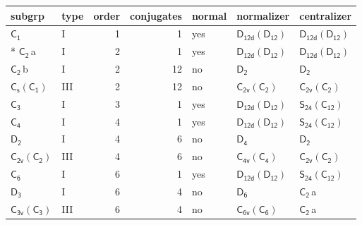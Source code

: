 \documentclass[10pt,a4paper]{article}
\numberwithin{equation}{section}
\newcommand{\grp}[1]{\mathsf{#1}}
\newcommand{\clsletter}[1]{\,{\scriptsize\color{black!55}#1}}
\begin{document}
{\small\begin{longtable}{@{}llrrlll@{}}\toprule
subgrp & type & order & conjugates & normal & normalizer & centralizer\\\midrule\endhead
\bottomrule\endfoot\endlastfoot
\href{../../../rotation/data/pdf/C1.pdf}{$\grp{C_{1}}$} & I & 1 & 1 & yes & \href{D12d-D12.pdf}{$\grp{D_{12d}}(\grp{D_{12}})$} & \href{D12d-D12.pdf}{$\grp{D_{12d}}(\grp{D_{12}})$}\\*
\href{../../../rotation/data/pdf/C2.pdf}{$\grp{C_{2}}$}\clsletter{a} & I & 2 & 1 & yes & \href{D12d-D12.pdf}{$\grp{D_{12d}}(\grp{D_{12}})$} & \href{D12d-D12.pdf}{$\grp{D_{12d}}(\grp{D_{12}})$}\\
\href{../../../rotation/data/pdf/C2.pdf}{$\grp{C_{2}}$}\clsletter{b} & I & 2 & 12 & no & \href{../../../rotation/data/pdf/D2.pdf}{$\grp{D_{2}}$} & \href{../../../rotation/data/pdf/D2.pdf}{$\grp{D_{2}}$}\\
\href{C1v-C1.pdf}{$\grp{C_{s}}(\grp{C_{1}})$} & III & 2 & 12 & no & \href{C2v-C2.pdf}{$\grp{C_{2v}}(\grp{C_{2}})$} & \href{C2v-C2.pdf}{$\grp{C_{2v}}(\grp{C_{2}})$}\\
\href{../../../rotation/data/pdf/C3.pdf}{$\grp{C_{3}}$} & I & 3 & 1 & yes & \href{D12d-D12.pdf}{$\grp{D_{12d}}(\grp{D_{12}})$} & \href{S24-C12.pdf}{$\grp{S_{24}}(\grp{C_{12}})$}\\
\href{../../../rotation/data/pdf/C4.pdf}{$\grp{C_{4}}$} & I & 4 & 1 & yes & \href{D12d-D12.pdf}{$\grp{D_{12d}}(\grp{D_{12}})$} & \href{S24-C12.pdf}{$\grp{S_{24}}(\grp{C_{12}})$}\\
\href{../../../rotation/data/pdf/D2.pdf}{$\grp{D_{2}}$} & I & 4 & 6 & no & \href{../../../rotation/data/pdf/D4.pdf}{$\grp{D_{4}}$} & \href{../../../rotation/data/pdf/D2.pdf}{$\grp{D_{2}}$}\\
\href{C2v-C2.pdf}{$\grp{C_{2v}}(\grp{C_{2}})$} & III & 4 & 6 & no & \href{C4v-C4.pdf}{$\grp{C_{4v}}(\grp{C_{4}})$} & \href{C2v-C2.pdf}{$\grp{C_{2v}}(\grp{C_{2}})$}\\
\href{../../../rotation/data/pdf/C6.pdf}{$\grp{C_{6}}$} & I & 6 & 1 & yes & \href{D12d-D12.pdf}{$\grp{D_{12d}}(\grp{D_{12}})$} & \href{S24-C12.pdf}{$\grp{S_{24}}(\grp{C_{12}})$}\\
\href{../../../rotation/data/pdf/D3.pdf}{$\grp{D_{3}}$} & I & 6 & 4 & no & \href{../../../rotation/data/pdf/D6.pdf}{$\grp{D_{6}}$} & \href{../../../rotation/data/pdf/C2.pdf}{$\grp{C_{2}}$}\clsletter{a}\\
\href{C3v-C3.pdf}{$\grp{C_{3v}}(\grp{C_{3}})$} & III & 6 & 4 & no & \href{C6v-C6.pdf}{$\grp{C_{6v}}(\grp{C_{6}})$} & \href{../../../rotation/data/pdf/C2.pdf}{$\grp{C_{2}}$}\clsletter{a}\\

\end{longtable}}
\end{document}
